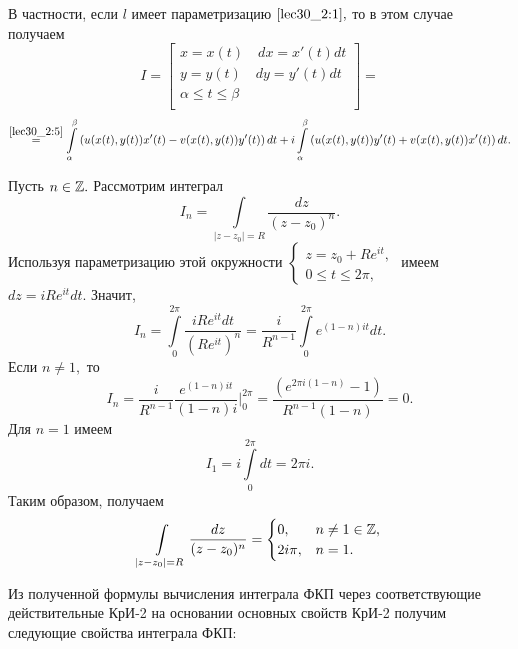 \documentclass[../../main.tex]{subfiles}
\begin{document}
В частности, если $l$ имеет параметризацию $\eqref{lec30_2:1},$ то в 
этом случае получаем
\[I = \left[
\begin{array}{c}
     x = x(t)\quad dx = x'(t)dt \\
     y = y(t)\quad dy = y'(t)dt \\
     \alpha \leq t \leq \beta\\
\end{array} 
\right]=\]
\[\stackrel{\eqref{lec30_2:5}}{=}
\int\limits_\alpha^\beta{\left(u(x(t), y(t))x'(t) - 
v(x(t), y(t))y'(t)\right)dt} + i\int\limits_\alpha^\beta{
\left(u(x(t), y(t))y'(t) + v(x(t), y(t))x'(t)\right)dt}.
\]

\begin{iexample}
    Пусть $n \in \mathbb{Z}.$ Рассмотрим интеграл
    \[I_n = \int\limits_{|z-z_0| = R}{\frac{dz}{\left(z-z_0\right)^n}}.\]
    Используя параметризацию этой окружности $
    \begin{cases}
     z=z_0 + R e^{it}, \\
    0 \leq t \leq 2\pi,
    \end{cases}$ \hspace{-1em} имеем
    $dz = iRe^{it}dt$.
    Значит, 
    \[I_n = \int\limits_0^{2\pi}{\frac{iRe^{it}dt}{
    (R e^{it})^n}} = \frac{i}{R^{n-1}}\int\limits_0^{2\pi}{
    e^{(1-n)it}dt}.\]
    Если $n \neq 1, $ то \[I_n = \frac{i}{R^{n-1}}\frac{
    e^{(1-n)it}}{(1-n)i}\bigg|_0^{2\pi} = \frac{
    (e^{2\pi i(1-n)}-1)}{R^{n-1}(1-n)} = 0.\]
    Для $n=1$ имеем \[I_1 = i\int\limits_0^{2\pi}{dt} = 2\pi i.\]
    Таким образом, получаем 
    \begin{equation}
        \label{lec30_2:6}
        \int\limits_{|z-z_0| = R}{\frac{dz}{(z-z_0)^n}} = 
        \begin{cases}
            0,& n \neq 1 \in \mathbb{Z},\\
            2i\pi,& n = 1.
        \end{cases}
    \end{equation}
\end{iexample}

Из полученной формулы вычисления интеграла ФКП через соответствующие
действительные КрИ-2 на основании основных свойств КрИ-2 получим 
следующие свойства интеграла ФКП:
\end{document}
